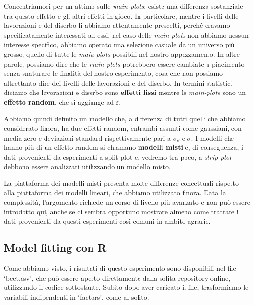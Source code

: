 \documentclass[a4paper,12pt,oneside]{book}
\begin{document}
Concentriamoci per un attimo sulle \emph{main-plots}: esiste una differenza sostanziale tra questo effetto e gli altri effetti in gioco. In particolare, mentre i livelli delle lavorazioni e del diserbo li abbiamo attentamente prescelti, perché eravamo specificatamente interessati ad essi, nel caso delle \emph{main-plots} non abbiamo nessun interesse specifico, abbiamo operato una selezione casuale da un universo più grosso, quello di tutte le \emph{main-plots} possibili nel nostro appezzamento. In altre parole, possiamo dire che le \emph{main-plots} potrebbero essere cambiate a piacimento senza snaturare le finalità del nostro esperimento, cosa che non possiamo altrettanto dire dei livelli delle lavorazioni e del diserbo. In termini statistici diciamo che lavorazioni e diserbo sono \textbf{effetti fissi} mentre le \emph{main-plots} sono un \textbf{effetto random}, che si aggiunge ad \(\varepsilon\).

Abbiamo quindi definito un modello che, a differenza di tutti quelli che abbiamo considerato finora, ha due effetti random, entrambi assunti come gaussiani, con media zero e deviazioni standard rispettivamente pari a \(\sigma_{\theta}\) e \(\sigma\). I modelli che hanno più di un effetto random si chiamano \textbf{modelli misti} e, di conseguenza, i dati provenienti da esperimenti a split-plot e, vedremo tra poco, a \emph{strip-plot} debbono essere analizzati utilizzando un modello misto.

La piattaforma dei modelli misti presenta molte differenze concettuali rispetto alla piattaforma dei modelli lineari, che abbiamo utilizzato finora. Data la complessità, l'argomento richiede un corso di livello più avanzato e non può essere introdotto qui, anche se ci sembra opportuno mostrare almeno come trattare i dati provenienti da questi esperimenti così comuni in ambito agrario.

\hypertarget{model-fitting-con-r}{%
\subsection{Model fitting con R}\label{model-fitting-con-r}}

Come abbiamo visto, i risultati di questo esperimento sono disponibili nel file `beet.csv', che può essere aperto direttamente dalla solita repository online, utilizzando il codice sottostante. Subito dopo aver caricato il file, trasformiamo le variabili indipendenti in `factors', come al solito.
\end{document}
